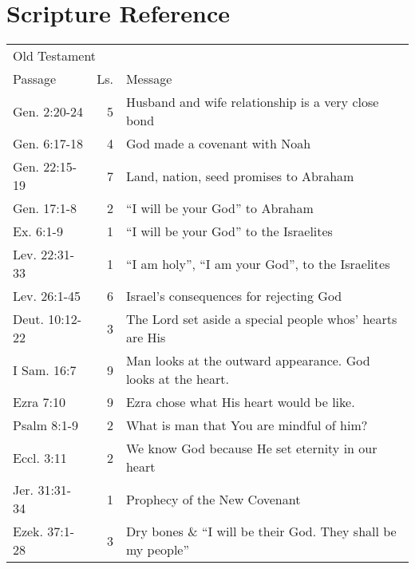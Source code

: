 \chapter{Scripture Reference}

\begin{table}[ht]%
\centering
\begin{tabular}{lrp{11cm}}
\toprule
\multicolumn{3}{l}{Old Testament}\\
Passage & Ls. & Message \\
\midrule
Gen. 2:20-24    & 5  & Husband and wife relationship is a very close bond\\
Gen. 6:17-18    & 4  & God made a covenant with Noah \\
Gen. 22:15-19   & 7  & Land, nation, seed promises to Abraham\\
Gen. 17:1-8     & 2  & ``I will be your God'' to Abraham\\
Ex. 6:1-9       & 1  & ``I will be your God'' to the Israelites\\
Lev. 22:31-33   & 1  & ``I am holy'', ``I am your God'', to the Israelites\\
Lev. 26:1-45    & 6  & Israel's consequences for rejecting God\\
Deut. 10:12-22  & 3  & The Lord set aside a special people whos' hearts are His\\
I Sam. 16:7     & 9  & Man looks at the outward appearance.  God looks at the heart.\\
Ezra 7:10       & 9  & Ezra chose what His heart would be like.\\
Psalm 8:1-9     & 2  & What is man that You are mindful of him?\\
Eccl. 3:11      & 2  & We know God because He set eternity in our heart\\
Jer. 31:31-34   & 1  & Prophecy of the New Covenant\\
Ezek. 37:1-28   & 3  & Dry bones \& ``I will be their God.  They shall be my people''\\
\bottomrule
\end{tabular}
\label{tab:ScriptureReferenceOT}
\end{table}
\clearpage

